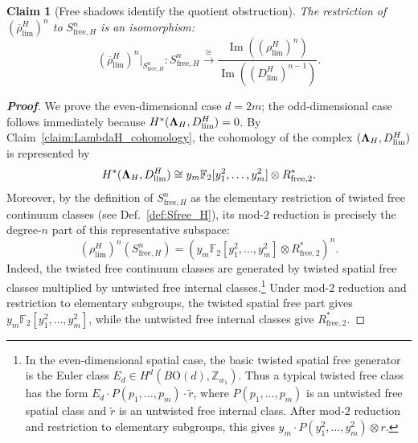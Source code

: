 \documentclass[aps,prx,reprint,superscriptaddress,twocolumn,amsmath,amssymb,amsfonts, nofootinbib]{revtex4-2}
\theoremstyle{apsstyle}
\newtheorem{claim}{Claim}
\begin{document}
\begin{claim}[Free shadows identify the quotient obstruction]
\label{claim:Sfree_H_quotient_iso}
The restriction of $\left(\overline{\rho}_{\lim}^{H}\right)^{n}$ to $S_{\mathrm{free},H}^{n}$ is an isomorphism:
\begin{equation}
\left(\overline{\rho}_{\lim}^{H}\right)^{n}\big\vert_{S_{\mathrm{free},H}^{n}}:
S_{\mathrm{free},H}^{n}
\xrightarrow{\cong}
\frac{\operatorname{Im}\left(\left(\rho_{\lim}^{H}\right)^{n}\right)}
{\operatorname{Im}\left(\left(D_{\lim}^{H}\right)^{n-1}\right)}.
\end{equation}
\end{claim}

\begin{proof}[\textnormal{\textbf{Proof}}]
We prove the even-dimensional case $d=2m$; the odd-dimensional case follows immediately because $H^{*}({\bf \Lambda}_{H},D_{\lim}^{H})=0$. By Claim~\ref{claim:LambdaH_cohomology}, the cohomology of the complex $({\bf \Lambda}_{H},D_{\lim}^{H})$ is represented by
\begin{equation}
H^{*}({\bf \Lambda}_{H},D_{\lim}^{H})
\cong
y_m\mathbb F_2[y_1^2,\dots,y_m^2]\otimes R_{\mathrm{free},2}^{*}.
\end{equation}
Moreover, by the definition of $S_{\mathrm{free},H}^{n}$ as the elementary restriction of twisted free continuum classes (see Def.~\ref{def:Sfree_H}), its mod-$2$ reduction is precisely the degree-$n$ part of this representative subspace:
\begin{equation}
\left(\rho_{\lim}^{H}\right)^{n}
\left(S_{\mathrm{free},H}^{n}\right)
=
\left(
y_m\mathbb F_2[y_1^2,\dots,y_m^2]\otimes R_{\mathrm{free},2}^{*}
\right)^{n}.
\label{eq:rho_Sfree_H_image}
\end{equation}
Indeed, the twisted free continuum classes are generated by twisted spatial free classes multiplied by untwisted free internal classes.\footnote{In the even-dimensional spatial case, the basic twisted spatial free generator is the Euler class $E_d\in H^d(B\mathrm{O}(d),\mathbb Z_{w_1})$. Thus a typical twisted free class has the form $E_d\cdot P(p_1,\dots,p_m)\cdot \widetilde r$, where $P(p_1,\dots,p_m)$ is an untwisted free spatial class and $\widetilde r$ is an untwisted free internal class. After mod-$2$ reduction and restriction to elementary subgroups, this gives $y_m\cdot P(y_1^2,\dots,y_m^2)\otimes r$.}
Under mod-$2$ reduction and restriction to elementary subgroups, the twisted spatial free part gives $y_m\mathbb F_2[y_1^2,\dots,y_m^2]$, while the untwisted free internal classes give $R_{\mathrm{free},2}^{*}$.


\end{proof}
\end{document}
